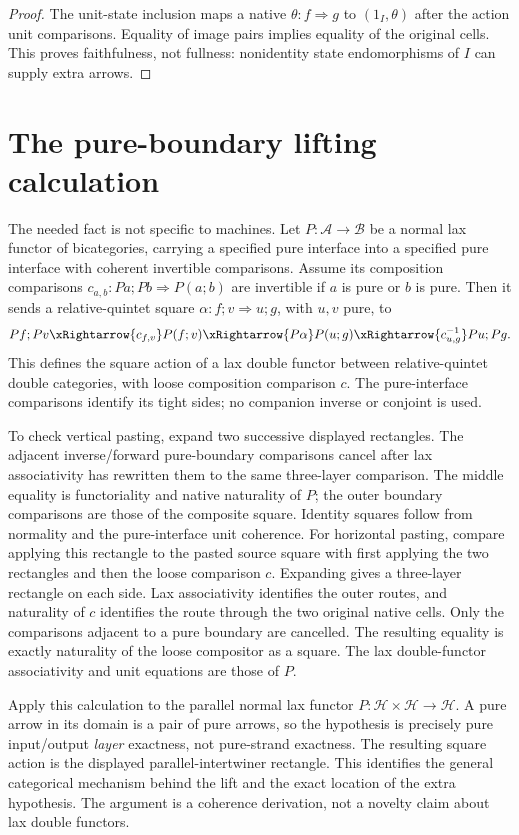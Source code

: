 \documentclass{article}
\begin{document}
\begin{proof}
The unit-state inclusion maps a native $\theta:f\Rightarrow g$ to $(1_I,\theta)$ after the action unit comparisons. Equality of image pairs implies equality of the original cells. This proves faithfulness, not fullness: nonidentity state endomorphisms of $I$ can supply extra arrows.
\end{proof}

\section{The pure-boundary lifting calculation}
The needed fact is not specific to machines. Let $P:\mathcal A\to\mathcal B$ be a normal lax functor of bicategories, carrying a specified pure interface into a specified pure interface with coherent invertible comparisons. Assume its composition comparisons $c_{a,b}:Pa;Pb\Rightarrow P(a;b)$ are invertible if $a$ is pure or $b$ is pure. Then it sends a relative-quintet square $\alpha:f;v\Rightarrow u;g$, with $u,v$ pure, to
\[
Pf;Pv\xRightarrow{c_{f,v}}P(f;v)
\xRightarrow{P\alpha}P(u;g)
\xRightarrow{c_{u,g}^{-1}}Pu;Pg.
\]
This defines the square action of a lax double functor between relative-quintet double categories, with loose composition comparison $c$. The pure-interface comparisons identify its tight sides; no companion inverse or conjoint is used.

To check vertical pasting, expand two successive displayed rectangles. The adjacent inverse/forward pure-boundary comparisons cancel after lax associativity has rewritten them to the same three-layer comparison. The middle equality is functoriality and native naturality of $P$; the outer boundary comparisons are those of the composite square. Identity squares follow from normality and the pure-interface unit coherence. For horizontal pasting, compare applying this rectangle to the pasted source square with first applying the two rectangles and then the loose comparison $c$. Expanding gives a three-layer rectangle on each side. Lax associativity identifies the outer routes, and naturality of $c$ identifies the route through the two original native cells. Only the comparisons adjacent to a pure boundary are cancelled. The resulting equality is exactly naturality of the loose compositor as a square. The lax double-functor associativity and unit equations are those of $P$.

Apply this calculation to the parallel normal lax functor $P:\mathcal H\times\mathcal H\to\mathcal H$. A pure arrow in its domain is a pair of pure arrows, so the hypothesis is precisely pure input/output \emph{layer} exactness, not pure-strand exactness. The resulting square action is the displayed parallel-intertwiner rectangle. This identifies the general categorical mechanism behind the lift and the exact location of the extra hypothesis. The argument is a coherence derivation, not a novelty claim about lax double functors.
\end{document}
